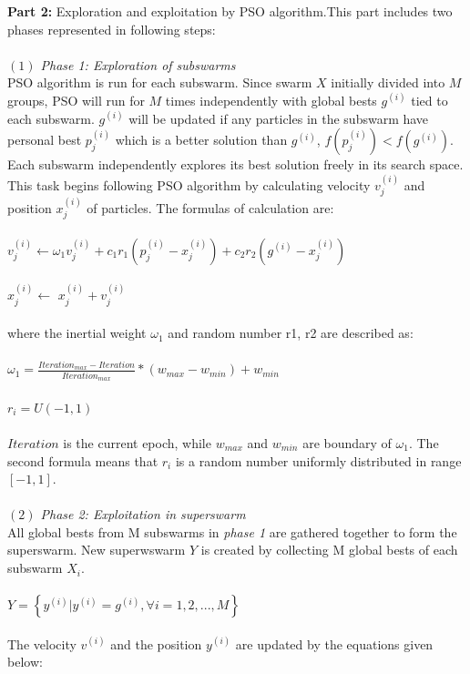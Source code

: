 \documentclass[a4paper]{article}
\begin{document}
\textbf{Part 2:} Exploration and exploitation by PSO algorithm.This part includes two phases represented in following steps: \\ \\
\textit{$(1)$ Phase 1: Exploration of subswarms} \\
PSO algorithm is run for each subswarm. Since swarm $X$ initially divided into $M$ groups, PSO will run for $M$ times independently with global bests $g^{(i)}$ tied to each subswarm. $g^{(i)}$ will be updated if any particles in the subswarm have personal best $p_j^{(i)}$ which is a better solution than $g^{(i)}$,  $f(p_j^{(i)}) < f(g^{(i)})$. \\
Each subswarm independently explores its best solution freely in its search space. This task begins following PSO algorithm by calculating velocity $v_j^{(i)}$ and position $x_j^{(i)}$ of particles. The formulas of calculation are: \\ \\
$v_j^{(i)}\gets\omega_1v_j^{(i)} + c_1r_1(p_j^{(i)} - x_j^{(i)}) + c_2r_2(g^{(i)} - x_j^{(i)})$ \\ \\
				$x_j^{(i)}\gets$ $x_j^{(i)} + v_j^{(i)}$ \\ \\
where the inertial weight $\omega_1$ and random number r1, r2 are described as:\\ \\
$\omega_1 = \frac{Iteration_{max} - Iteration}{Iteration_{max}}*(w_{max} - w_{min}) + w_{min}$ \\ \\
$r_i = U(-1, 1)$ \\ \\
$Iteration$ is the current epoch, while $w_{max}$ and $w_{min}$ are boundary of $\omega_1$. The second formula means that $r_i$ is a random number uniformly distributed in range $[-1, 1]$. \\ \\
\textit{$(2)$ Phase 2: Exploitation in superswarm} \\
All global bests from M subswarms in \textit{phase 1} are gathered together to form the superswarm. New superwswarm $Y$ is created by collecting M global bests of each subswarm $X_i$. \\ \\
$Y = \left\{y^{(i)}| y^{(i)} = g^{(i)}, \forall i = 1, 2, ..., M\right\}$ \\ \\
The velocity $v^{(i)}$ and the position $y^{(i)}$ are updated by the equations given below: \\ \\
\end{document}
